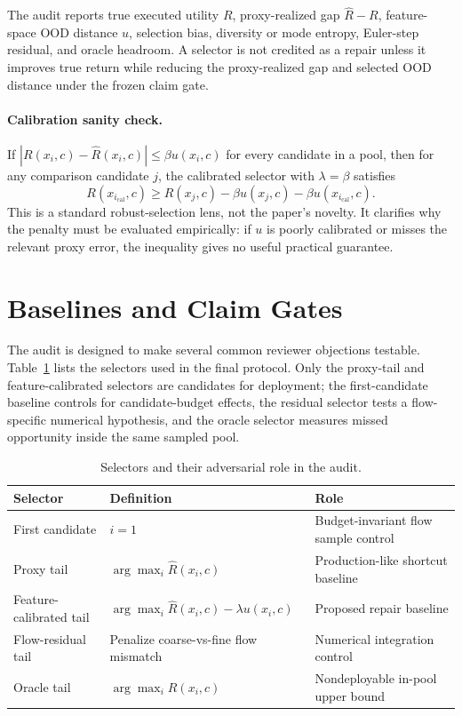 \documentclass[10pt]{article}
\begin{document}
The audit reports true executed utility \(R\), proxy-realized gap \(\hat R-R\), feature-space OOD distance \(u\), selection bias, diversity or mode entropy, Euler-step residual, and oracle headroom. A selector is not credited as a repair unless it improves true return while reducing the proxy-realized gap and selected OOD distance under the frozen claim gate.

\paragraph{Calibration sanity check.}
If \(|R(x_i,c)-\hat R(x_i,c)| \le \beta u(x_i,c)\) for every candidate in a pool, then for any comparison candidate \(j\), the calibrated selector with \(\lambda=\beta\) satisfies
\[
R(x_{i_{\mathrm{cal}}},c) \ge R(x_j,c) - \beta u(x_j,c) - \beta u(x_{i_{\mathrm{cal}}},c).
\]
This is a standard robust-selection lens, not the paper's novelty. It clarifies why the penalty must be evaluated empirically: if \(u\) is poorly calibrated or misses the relevant proxy error, the inequality gives no useful practical guarantee.

\section{Baselines and Claim Gates}

The audit is designed to make several common reviewer objections testable. Table~\ref{tab:selectors} lists the selectors used in the final protocol. Only the proxy-tail and feature-calibrated selectors are candidates for deployment; the first-candidate baseline controls for candidate-budget effects, the residual selector tests a flow-specific numerical hypothesis, and the oracle selector measures missed opportunity inside the same sampled pool.

\begin{table}[t]
\centering
\caption{Selectors and their adversarial role in the audit.}
\label{tab:selectors}
\begin{tabular}{lll}
\toprule
Selector & Definition & Role \\
\midrule
First candidate & \(i=1\) & Budget-invariant flow sample control \\
Proxy tail & \(\arg\max_i \hat R(x_i,c)\) & Production-like shortcut baseline \\
Feature-calibrated tail & \(\arg\max_i \hat R(x_i,c)-\lambda u(x_i,c)\) & Proposed repair baseline \\
Flow-residual tail & Penalize coarse-vs-fine flow mismatch & Numerical integration control \\
Oracle tail & \(\arg\max_i R(x_i,c)\) & Nondeployable in-pool upper bound \\
\bottomrule
\end{tabular}
\end{table}
\end{document}
